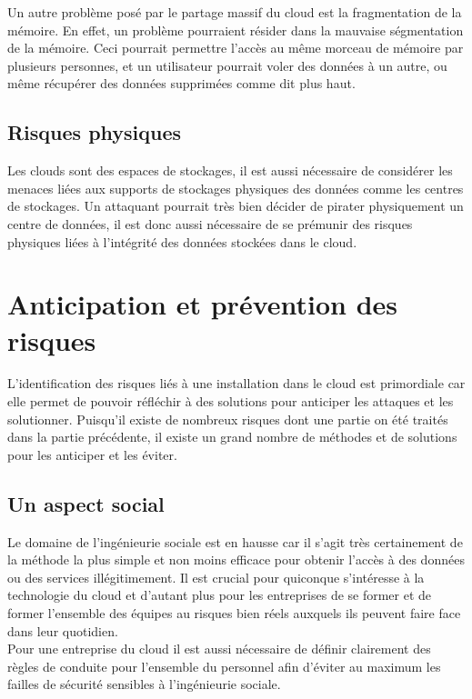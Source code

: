 \documentclass[a4paper, 12pt]{article}
\begin{document}
      Un autre problème posé par le partage massif du cloud est la fragmentation
      de la mémoire. En effet, un problème pourraient résider dans la mauvaise
      ségmentation de la mémoire. Ceci pourrait permettre l'accès au même
      morceau de mémoire par plusieurs personnes, et un utilisateur pourrait
      voler des données à un autre, ou même récupérer des données supprimées
      comme dit plus haut.

    \subsection{Risques physiques}
      Les clouds sont des espaces de stockages, il est aussi nécessaire de
      considérer les menaces liées aux supports de stockages physiques des
      données comme les centres de stockages. Un attaquant pourrait très bien
      décider de pirater physiquement un centre de données, il est donc aussi
      nécessaire de se prémunir des risques physiques liées à l'intégrité des
      données stockées dans le cloud.

  \section{Anticipation et prévention des risques}
      L'identification des risques liés à une installation dans le cloud est
      primordiale car elle permet de pouvoir réfléchir à des solutions pour
      anticiper les attaques et les solutionner. Puisqu'il existe de nombreux
      risques dont une partie on été traités dans la partie précédente, il
      existe un grand nombre de méthodes et de solutions pour les anticiper
      et les éviter.

      \subsection{Un aspect social}
      Le domaine de l'ingénieurie sociale est en hausse car il s'agit très
      certainement de la méthode la plus simple et non moins efficace pour
      obtenir l'accès à des données ou des services illégitimement. Il est
      crucial pour quiconque s'intéresse à la technologie du cloud et d'autant
      plus pour les entreprises de se former et de former l'ensemble des
      équipes au risques bien réels auxquels ils peuvent faire face dans leur
      quotidien. \\

      Pour une entreprise du cloud il est aussi nécessaire de définir
      clairement des règles de conduite pour l'ensemble du personnel afin
      d'éviter au maximum les failles de sécurité sensibles à l'ingénieurie
      sociale.
\end{document}
